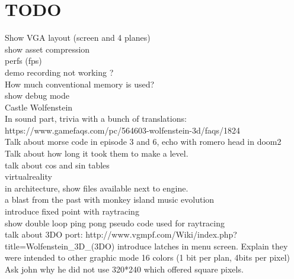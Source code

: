 \documentclass[8pt]{book}
\begin{document}
    \chapter{TODO}
    Show VGA layout (screen and 4 planes)\\
    show asset compression\\
    perfs (fps)\\
demo recording not working ?\\
How much conventional memory is used?\\
show debug mode\\
Castle Wolfenstein\\
In sound part, trivia with a bunch of translations: https://www.gamefaqs.com/pc/564603-wolfenstein-3d/faqs/1824\\
Talk about morse code in episode 3 and 6, echo with romero head in doom2\\
Talk about how long it took them to make a level.\\
talk about cos and sin tables\\
virtualreality\\
in architecture, show files available next to engine.\\
a blast from the past with monkey island music evolution\\
introduce fixed point with raytracing\\
show double loop ping pong pseudo code used for raytracing\\
talk about 3DO port: http://www.vgmpf.com/Wiki/index.php?title=Wolfenstein\_3D\_(3DO)
introduce latches in menu screen. Explain they were intended to other graphic mode 16 colors (1 bit per plan, 4bits per pixel)
Ask john why he did not use 320*240 which offered square pixels.

\end{document}
